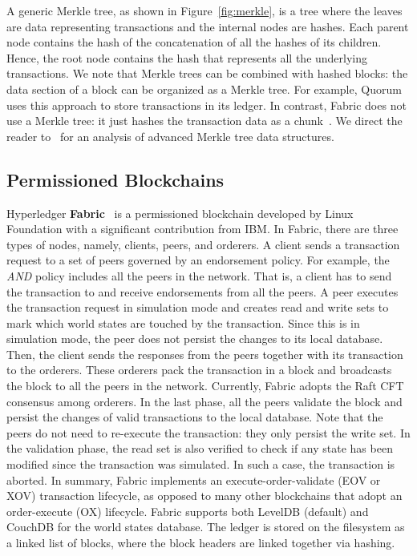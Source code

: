 \documentclass[11pt]{article}
\begin{document}
A generic Merkle tree, as shown in Figure~\ref{fig:merkle}, is a tree where the
leaves are data representing transactions and the internal nodes are hashes.
Each parent node contains the hash of the concatenation of all the hashes of its
children. Hence, the root node contains the hash that represents all the
underlying transactions. We note that Merkle trees can be combined with hashed
blocks: the data section of a block can be organized as a Merkle tree. For
example, Quorum uses this approach to store transactions in its ledger. In
contrast, Fabric does not use a Merkle tree: it just hashes the transaction data
as a chunk~\cite{fabric_ledger}. We direct the reader to~\cite{mpt} for an
analysis of advanced Merkle tree data structures.

\subsection{Permissioned Blockchains}

Hyperledger \textbf{Fabric}~\cite{fabric} is a permissioned blockchain developed by Linux Foundation with a significant contribution from IBM. In Fabric, there are three types of nodes, namely, clients, peers, and orderers. A client sends a transaction request to a set of peers governed by an endorsement policy. 
For example, the \textit{AND} policy includes all the peers in the network. That is, a client has to send the transaction to and receive endorsements from all the peers. 
A peer executes the transaction request in simulation mode and creates read and write sets to mark which world states are touched by the transaction. Since this is in simulation mode, the peer does not persist the changes to its local database. Then, the client sends the responses from the peers together with its transaction to the orderers. These orderers pack the transaction in a block and broadcasts the block to all the peers in the network. Currently, Fabric adopts the Raft CFT consensus among orderers. In the last phase, all the peers validate the block and persist the changes of valid transactions to the local database. Note that the peers do not need to re-execute the transaction: they only persist the write set. In the validation phase, the read set is also verified to check if any state has been modified since the transaction was simulated. In such a case, the transaction is aborted. In summary, Fabric implements an execute-order-validate (EOV or XOV) transaction lifecycle, as opposed to many other blockchains that adopt an order-execute (OX) lifecycle. Fabric supports both LevelDB (default) and CouchDB for the world states database. The ledger is stored on the filesystem as a linked list of blocks, where the block headers are linked together via hashing.
\end{document}
